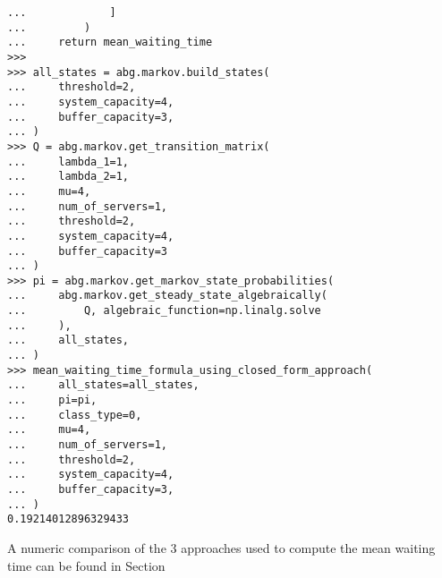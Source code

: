 \begin{lstlisting}[style=pystyle]
...             ]
...         )
...     return mean_waiting_time
>>>
>>> all_states = abg.markov.build_states(
...     threshold=2,
...     system_capacity=4,
...     buffer_capacity=3,
... )
>>> Q = abg.markov.get_transition_matrix(
...     lambda_1=1,
...     lambda_2=1,
...     mu=4,
...     num_of_servers=1,
...     threshold=2,
...     system_capacity=4,
...     buffer_capacity=3
... )
>>> pi = abg.markov.get_markov_state_probabilities(
...     abg.markov.get_steady_state_algebraically(
...         Q, algebraic_function=np.linalg.solve
...     ),
...     all_states,
... )
>>> mean_waiting_time_formula_using_closed_form_approach(
...     all_states=all_states,
...     pi=pi,
...     class_type=0,
...     mu=4,
...     num_of_servers=1,
...     threshold=2,
...     system_capacity=4,
...     buffer_capacity=3,
... )
0.19214012896329433

\end{lstlisting}

A numeric comparison of the 3 approaches used to compute the mean waiting time
can be found in Section 
